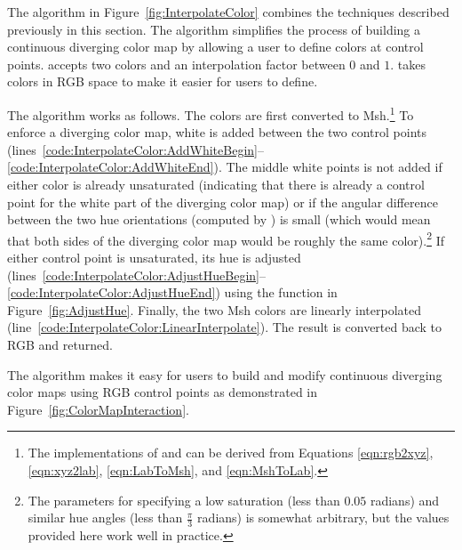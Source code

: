 \documentclass[review,journal]{vgtc}         %
\newcommand{\RGB}{RGB\xspace}
\newcommand{\Msh}{Msh\xspace}
\begin{document}
The  algorithm in Figure~\ref{fig:InterpolateColor}
combines the techniques described previously in this section.  The
algorithm simplifies the process of building a continuous diverging color
map by allowing a user to define colors at control points.
 accepts two colors and an interpolation factor
between $0$ and $1$.   takes colors in \RGB space to
make it easier for users to define.

The  algorithm works as follows.  The colors are
first converted to \Msh.\footnote{The implementations of  and
 can be derived from Equations \ref{eqn:rgb2xyz},
\ref{eqn:xyz2lab}, \ref{eqn:LabToMsh}, and \ref{eqn:MshToLab}.}  To enforce
a diverging color map, white is added between the two control points
(lines~\ref{code:InterpolateColor:AddWhiteBegin}--\ref{code:InterpolateColor:AddWhiteEnd}).
The middle white points is not added if either color is already unsaturated
(indicating that there is already a control point for the white part of the
diverging color map) or if the angular difference between the two hue
orientations (computed by ) is small (which would mean that
both sides of the diverging color map would be roughly the same
color).\footnote{The parameters for specifying a low saturation (less than
$0.05$ radians) and similar hue angles (less than $\frac{\pi}{3}$ radians)
is somewhat arbitrary, but the values provided here work well in practice.}
If either control point is unsaturated, its hue is adjusted
(lines~\ref{code:InterpolateColor:AdjustHueBegin}--\ref{code:InterpolateColor:AdjustHueEnd})
using the  function in Figure~\ref{fig:AdjustHue}.
Finally, the two \Msh colors are linearly interpolated
(line~\ref{code:InterpolateColor:LinearInterpolate}).  The result is
converted back to \RGB and returned.

The  algorithm makes it easy for users to build and
modify continuous diverging color maps using \RGB control points as
demonstrated in Figure~\ref{fig:ColorMapInteraction}.
\end{document}
